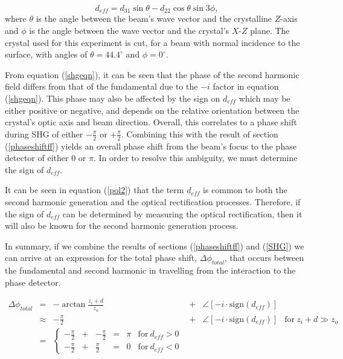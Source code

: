 \begin{equation}\label{deff}
d_{eff}=d_{31}\sin{\theta} - d_{22}\cos{\theta}\sin{3\phi},
\end{equation} where $\theta$ is the angle between the beam's wave vector and the
crystalline $Z$-axis and $\phi$ is the angle between the wave
vector and the crystal's $X$-$Z$ plane.  The crystal used for this
experiment is cut, for a beam with normal incidence to the
surface, with angles of $\theta=44.4^\circ$ and $\phi=0^\circ$.

From equation (\ref{shgeqn}), it can be seen that the phase of the
second harmonic field differs from that of the fundamental due to
the \(-i\) factor in equation (\ref{shgeqn}). This phase may also
be affected by the sign on \(d_{eff}\) which may be either
positive or negative, and depends on the relative orientation
between the crystal's optic axis and beam direction. Overall, this
correlates to a phase shift during SHG of either $-\frac{\pi}{2}$
or $+\frac{\pi}{2}$.  Combining this with the result of section
(\ref{phaseshiftff}) yields an overall phase shift from the beam's
focus to the phase detector of either $0$ or $\pi$.  In order to
resolve this ambiguity, we must determine the sign of $d_{eff}$.

It can be seen in equation (\ref{pol2}) that the term $d_{eff}$ is
common to both the second harmonic generation and the optical
rectification processes.  Therefore, if the sign of $d_{eff}$ can
be determined by measuring the optical rectification, then it will
also be known for the second harmonic generation process.

In summary, if we combine the results of sections
(\ref{phaseshiftff}) and (\ref{SHG}) we can arrive at an
expression for the total phase shift, $\Delta\phi_{total}$, that
occurs between the fundamental and second harmonic in travelling
from the interaction to the phase detector.

\begin{equation}
\begin{array}{cccccc}
\Delta\phi_{total}&=&-\arctan{\frac{z_i+d}{z_o}}&+&\angle \left[-i \cdot \mbox{sign}(d_{eff}) \right] &\\
                  &\approx& -\frac{\pi}{2}       &+&\angle \left[-i \cdot \mbox{sign}(d_{eff})  \right]&\mbox{for}\ z_i+d\gg z_o\\
                  &=& \left\{ \begin{array}{cccccc}
                  -\frac{\pi}{2}&+& -\frac{\pi}{2}&=&\pi &\mbox{for}\ d_{eff} >  0 \\
                  -\frac{\pi}{2}&+& \frac{\pi}{2}&=&0 &\mbox{for}\ d_{eff} < 0
                  \end{array} \right.
\end{array}
\end{equation}

